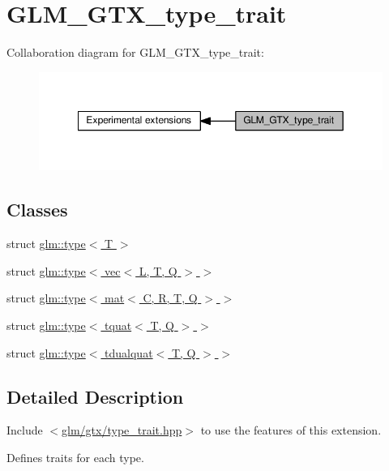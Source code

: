 \hypertarget{group__gtx__type__trait}{}\section{G\+L\+M\+\_\+\+G\+T\+X\+\_\+type\+\_\+trait}
\label{group__gtx__type__trait}
Collaboration diagram for G\+L\+M\+\_\+\+G\+T\+X\+\_\+type\+\_\+trait\+:
\nopagebreak
\begin{figure}[H]
\begin{center}
\leavevmode
\includegraphics[width=349pt]{d9/dd5/group__gtx__type__trait}
\end{center}
\end{figure}
\subsection*{Classes}
\begin{DoxyCompactItemize}
\item 
struct \hyperlink{structglm_1_1type}{glm\+::type$<$ T $>$}
\item 
struct \hyperlink{structglm_1_1type_3_01vec_3_01L_00_01T_00_01Q_01_4_01_4}{glm\+::type$<$ vec$<$ L, T, Q $>$ $>$}
\item 
struct \hyperlink{structglm_1_1type_3_01mat_3_01C_00_01R_00_01T_00_01Q_01_4_01_4}{glm\+::type$<$ mat$<$ C, R, T, Q $>$ $>$}
\item 
struct \hyperlink{structglm_1_1type_3_01tquat_3_01T_00_01Q_01_4_01_4}{glm\+::type$<$ tquat$<$ T, Q $>$ $>$}
\item 
struct \hyperlink{structglm_1_1type_3_01tdualquat_3_01T_00_01Q_01_4_01_4}{glm\+::type$<$ tdualquat$<$ T, Q $>$ $>$}
\end{DoxyCompactItemize}


\subsection{Detailed Description}
Include $<$\hyperlink{type__trait_8hpp}{glm/gtx/type\+\_\+trait.\+hpp}$>$ to use the features of this extension.

Defines traits for each type. 